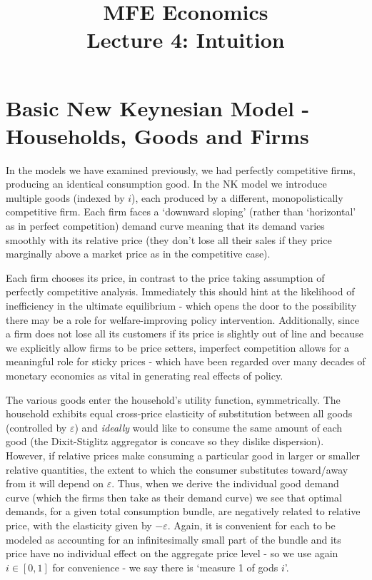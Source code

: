 \documentclass[authoryear,11pt]{elsarticle}
\begin{document}
\begin{frontmatter}
\title{MFE Economics\\Lecture 4: Intuition}
\end{frontmatter}


\section{Basic New Keynesian Model - Households, Goods and Firms}
In the models we have examined previously, we had perfectly competitive firms, producing an identical consumption good. In the NK model we introduce multiple goods (indexed by $i$), each produced by a different, monopolistically competitive firm. Each firm faces a `downward sloping' (rather than `horizontal' as in perfect competition) demand curve meaning that its demand varies smoothly with its relative price (they don't lose all their sales if they price marginally above a market price as in the competitive case).

Each firm chooses its price, in contrast to the price taking assumption of perfectly competitive analysis. Immediately this should hint at the likelihood of inefficiency in the ultimate equilibrium - which opens the door to the possibility there may be a role for welfare-improving policy intervention. Additionally, since a firm does not lose all its customers if its price is slightly out of line and because we explicitly allow firms to be price setters, imperfect competition allows for a meaningful role for sticky prices - which have been regarded over many decades of monetary economics as vital in generating real effects of policy.

The various goods enter the household's utility function, symmetrically. The household exhibits equal cross-price elasticity of substitution between all goods (controlled by $\varepsilon$) and \textit{ideally} would like to consume the same amount of each good (the Dixit-Stiglitz aggregator is concave so they dislike dispersion). However, if relative prices make consuming a particular good in larger or smaller relative quantities, the extent to which the consumer substitutes toward/away from it will depend on $\varepsilon$. Thus, when we derive the individual good demand curve (which the firms then take as their demand curve) we see that optimal demands, for a given total consumption bundle, are negatively related to relative price, with the elasticity given by $-\varepsilon$. Again, it is convenient for each to be modeled as accounting for an infinitesimally small part of the bundle and its price have no individual effect on the aggregate price level - so we use again $i\in[0,1]$ for convenience - we say there is `measure 1 of gods $i$'.
\end{document}
